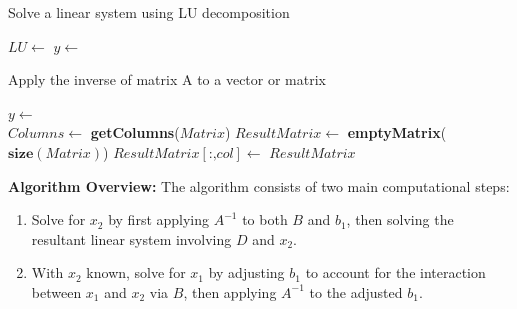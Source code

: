 \documentclass[11pt,onecolumn]{article}
\begin{document}
\begin{enumerate}[label=(\alph*)]
          \begin{algorithm}
              \caption{Solve a linear system using LU decomposition}
              \begin{algorithmic}[1]
                  \State $LU \gets$ 
                  \State $y \gets$ 
                  \State \Return {}
                  \EndFunction
              \end{algorithmic}
          \end{algorithm}

          \begin{algorithm}
              \caption{Apply the inverse of matrix A to a vector or matrix}
              \begin{algorithmic}[1]
                  \State $y \gets$ 
                  \State \Return {}
                  \EndFunction
                  \\
                  \State $Columns \gets$ \textbf{getColumns}($Matrix$)
                  \State $ResultMatrix \gets$ \textbf{emptyMatrix}($\textbf{size}(Matrix)$)
                  \State $ResultMatrix[\textbf{:,} col] \gets$ 
                  \EndFor
                  \State \Return $ResultMatrix$
                  \EndFunction
              \end{algorithmic}
          \end{algorithm}


          \pagebreak
          \pagebreak
          \textbf{Algorithm Overview:}
          The algorithm consists of two main computational steps:
          \begin{enumerate}
              \item Solve for \(x_2\) by first applying \(A^{-1}\) to both \(B\) and \(b_1\), then solving the resultant linear system involving \(D\) and \(x_2\).
              \item With \(x_2\) known, solve for \(x_1\) by adjusting \(b_1\) to account for the interaction between \(x_1\) and \(x_2\) via \(B\), then applying \(A^{-1}\) to the adjusted \(b_1\).
          \end{enumerate}


\end{enumerate}
\end{document}
